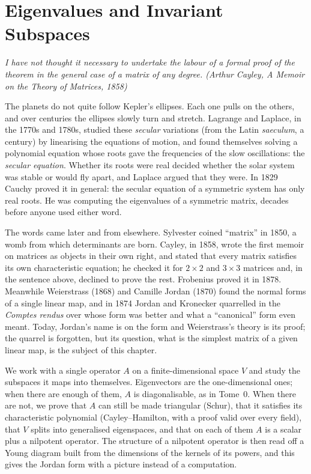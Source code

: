 \chapter{Eigenvalues and Invariant Subspaces}\label{linear:ch:eigen}

\begin{center}\itshape
I have not thought it necessary to undertake the labour of a formal proof of the theorem in the general case of a
matrix of any degree.
\upshape(Arthur Cayley, \emph{A Memoir on the Theory of Matrices}, 1858)
\end{center}

The planets do not quite follow Kepler's ellipses. Each one pulls on the others, and over centuries the ellipses
slowly turn and stretch. Lagrange and Laplace, in the 1770s and 1780s, studied these \emph{secular} variations (from
the Latin \emph{saeculum}, a century) by linearising the equations of motion, and found themselves solving a polynomial
equation whose roots gave the frequencies of the slow oscillations: the \emph{secular equation}. Whether its roots
were real decided whether the solar system was stable or would fly apart, and Laplace argued that they were. In 1829
Cauchy proved it in general: the secular equation of a symmetric system has only real roots. He was computing the
eigenvalues of a symmetric matrix, decades before anyone used either word.

The words came later and from elsewhere. Sylvester coined ``matrix'' in 1850, a womb from which determinants are born.
Cayley, in 1858, wrote the first memoir on matrices as objects in their own right, and stated that every matrix
satisfies its own characteristic equation; he checked it for $2\times2$ and $3\times3$ matrices and, in the sentence
above, declined to prove the rest. Frobenius proved it in 1878. Meanwhile Weierstrass (1868) and Camille Jordan (1870)
found the normal forms of a single linear map, and in 1874 Jordan and Kronecker quarrelled in the \emph{Comptes rendus}
over whose form was better and what a ``canonical'' form even meant. Today, Jordan's name is on the form and
Weierstrass's theory is its proof; the quarrel is forgotten, but its question, what is the simplest matrix of a given
linear map, is the subject of this chapter.

We work with a single operator $A$ on a finite-dimensional space $V$ and study the subspaces it maps into themselves.
Eigenvectors are the one-dimensional ones; when there are enough of them, $A$ is diagonalisable, as in Tome~0. When
there are not, we prove that $A$ can still be made triangular (Schur), that it satisfies its characteristic polynomial
(Cayley--Hamilton, with a proof valid over every field), that $V$ splits into generalised eigenspaces, and that on each of
them $A$ is a scalar plus a nilpotent operator. The structure of a nilpotent operator is then read off a Young diagram
built from the dimensions of the kernels of its powers, and this gives the Jordan form with a picture instead of a
computation.

